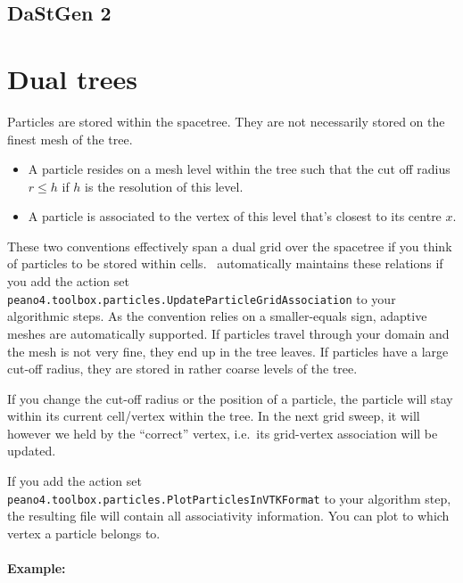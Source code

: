 \subsection{DaStGen 2}




\section{Dual trees}

Particles are stored within the spacetree.
They are not necessarily stored on the finest mesh of the tree.

\begin{itemize}
  \item A particle resides on a mesh level within the tree such that the
  cut off radius $r \leq h$ if $h$ is the resolution of this level.
  \item A particle is associated to the vertex of this level that's closest to
  its centre $x$.
\end{itemize}

\noindent
These two conventions effectively span a dual grid over the spacetree if you
think of particles to be stored within cells.
\Peano\ automatically maintains these relations if you add the action set 
\texttt{peano4.toolbox.particles.UpdateParticleGridAssociation} to your
algorithmic steps.
As the convention relies on a smaller-equals sign, adaptive meshes are
automatically supported.
If particles travel through your domain and the mesh is not very fine, they
end up in the tree leaves.
If particles have a large cut-off radius, they are stored in rather coarse
levels of the tree.


If you change the cut-off radius or the position of a particle, the particle
will stay within its current cell/vertex within the tree.
In the next grid sweep, it will however we held by the ``correct'' vertex,
i.e.~its grid-vertex association will be updated.


If you add the action set
\texttt{peano4.toolbox.particles.PlotParticlesInVTKFormat} to your algorithm
step, the resulting file will contain all associativity information.
You can plot to which vertex a particle belongs to.


\paragraph{Example:}

